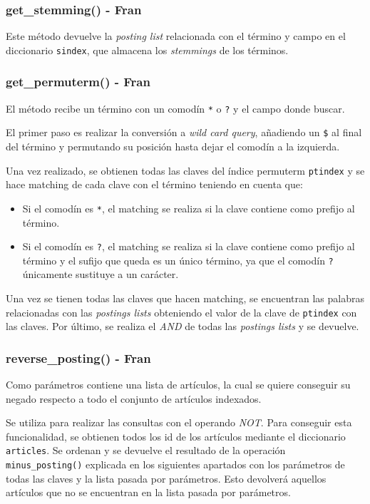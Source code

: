\documentclass[12pt,a4paper]{article}
\begin{document}
\subsubsection{get\_stemming() - Fran}
Este método devuelve la \textit{posting list} relacionada con el término y campo en el diccionario \texttt{sindex}, que almacena los \textit{stemmings} de los términos.

\subsubsection{get\_permuterm() - Fran}
El método recibe un término con un comodín \texttt{*} o \texttt{?} y el campo donde buscar.

El primer paso es realizar la conversión a \textit{wild card query}, añadiendo un \texttt{\$} al final del término y permutando su posición hasta dejar el comodín a la izquierda.

Una vez realizado, se obtienen todas las claves del índice permuterm \texttt{ptindex} y se hace matching de cada clave con el término teniendo en cuenta que:
\begin{itemize}
  \item Si el comodín es \texttt{*}, el matching se realiza si la clave contiene como prefijo al término.
  \item Si el comodín es \texttt{?}, el matching se realiza si la clave contiene como prefijo al término y el sufijo que queda es un único término, ya que el comodín \texttt{?} únicamente sustituye a un carácter.
\end{itemize}

Una vez se tienen todas las claves que hacen matching, se encuentran las palabras relacionadas con las \textit{postings lists} obteniendo el valor de la clave de \texttt{ptindex} con las claves. Por último, se realiza el \textit{AND} de todas las \textit{postings lists} y se devuelve.

\subsubsection{reverse\_posting() - Fran}
Como parámetros contiene una lista de artículos, la cual se quiere conseguir su negado respecto a todo el conjunto de artículos indexados.

Se utiliza para realizar las consultas con el operando \textit{NOT}. Para conseguir esta funcionalidad, se obtienen todos los id de los artículos mediante el diccionario \texttt{articles}. Se ordenan y se devuelve el resultado de la operación \texttt{minus\_posting()} explicada en los siguientes apartados con los parámetros de todas las claves y la lista pasada por parámetros. Esto devolverá aquellos artículos que no se encuentran en la lista pasada por parámetros.
\end{document}
